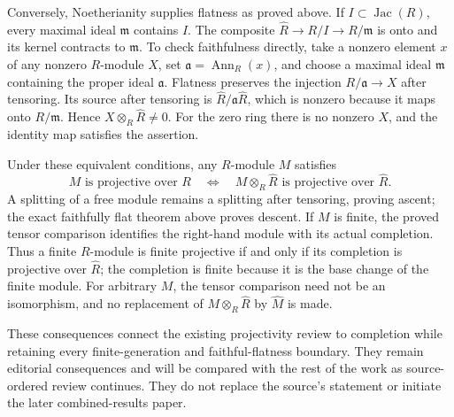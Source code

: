 Conversely, Noetherianity supplies flatness as proved above. If \(I\subset\operatorname{Jac}(R)\), every maximal ideal \(\mathfrak m\) contains \(I\). The composite \(\widehat R\to R/I\to R/\mathfrak m\) is onto and its kernel contracts to \(\mathfrak m\). To check faithfulness directly, take a nonzero element \(x\) of any nonzero \(R\)-module \(X\), set \(\mathfrak a=\operatorname{Ann}_R(x)\), and choose a maximal ideal \(\mathfrak m\) containing the proper ideal \(\mathfrak a\). Flatness preserves the injection \(R/\mathfrak a\to X\) after tensoring. Its source after tensoring is \(\widehat R/\mathfrak a\widehat R\), which is nonzero because it maps onto \(R/\mathfrak m\). Hence \(X\otimes_R\widehat R\ne0\). For the zero ring there is no nonzero \(X\), and the identity map satisfies the assertion.

Under these equivalent conditions, any \(R\)-module \(M\) satisfies \[
M\text{ is projective over }R
\quad\Longleftrightarrow\quad
M\otimes_R\widehat R\text{ is projective over }\widehat R .
\] A splitting of a free module remains a splitting after tensoring, proving ascent; the exact faithfully flat theorem above proves descent. If \(M\) is finite, the proved tensor comparison identifies the right-hand module with its actual completion. Thus a finite \(R\)-module is finite projective if and only if its completion is projective over \(\widehat R\); the completion is finite because it is the base change of the finite module. For arbitrary \(M\), the tensor comparison need not be an isomorphism, and no replacement of \(M\otimes_R\widehat R\) by \(\widehat M\) is made.

These consequences connect the existing projectivity review to completion while retaining every finite-generation and faithful-flatness boundary. They remain editorial consequences and will be compared with the rest of the work as source-ordered review continues. They do not replace the source's statement or initiate the later combined-results paper.
